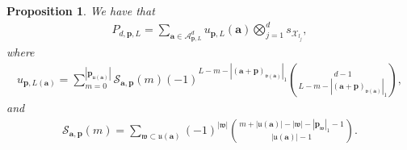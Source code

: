 \documentclass[pdflatex,sn-mathphys-num]{sn-jnl}%
\theoremstyle{thmstyleone}%
\newtheorem{proposition}{Proposition}%
\theoremstyle{thmstyletwo}%
\theoremstyle{thmstylethree}%
\begin{document}
\begin{proposition}\label{prop: alt alt LISG def}
    We have that
    \begin{align}
        P_{d,\mathbf{p},L}=\sum_{\mathbf{a}\in\mathcal{A}_{\mathbf{p},L}^d}u_{\mathbf{p},L}(\mathbf{a})\bigotimes_{j=1}^ds_{\mathcal{X}_{l_j}},\nonumber
    \end{align}
    where
    \begin{align}
        u_{\mathbf{p},L(\mathbf{a})}=\sum_{m=0}^{|\mathbf{p}_{\mathfrak{u}(\mathbf{a})}|}\mathscr{S}_{\mathbf{a},\mathbf{p}}(m)(-1)^{L-m-|(\mathbf{a}+\mathbf{p})_{\mathfrak{v}(\mathbf{a})}|_1}\binom{d-1}{L-m-|(\mathbf{a}+\mathbf{p})_{\mathfrak{v}(\mathbf{a})}|_1},\nonumber
    \end{align}
    and
    \begin{align}
    \mathscr{S}_{\mathbf{a},\mathbf{p}}(m)=\sum_{\mathfrak{w}\subset\mathfrak{u}(\mathbf{a})}(-1)^{|\mathfrak{w}|}\binom{m+|\mathfrak{u}(\mathbf{a})|-|\mathfrak{w}|-|\mathbf{p}_{\mathfrak{w}}|_1-1}{|\mathfrak{u(\mathbf{a})}|-1}.\nonumber
    \end{align}
\end{proposition}
\end{document}
